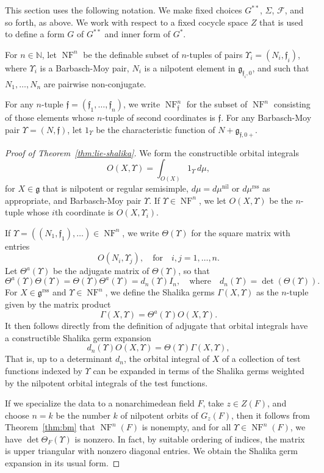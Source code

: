 \documentclass[12pt]{amsart}
\newcommand{\op}[1]{\operatorname{#1}}
\newcommand{\ring}[1]{{\mathbb #1}}
\def\NF{\op{NF}}
\def\Y{\Upsilon}
\def\s{{\mathfrak{f}}}
\newcommand{\cF}{\mathcal{F}}
\newcommand{\fg}{\mathfrak{g}}
\newcommand{\reg}{\mathrm{rss}}
\theoremstyle{plain}
\theoremstyle{definition}
\begin{document}
This section uses the following notation.  We make fixed choices
$G^{**}$, $\Sigma$, $\cF$, and so forth, as above.
We work with respect to a fixed cocycle space $Z$ that is used to
define a form $G$ of $G^{**}$ and inner form of $G^*$.

For $n\in \ring{N}$, let $\NF^n$ be the definable subset of $n$-tuples
of pairs $\Y_i=(N_i,\s_i)$, where $\Y_i$ is a Barbasch-Moy pair, $N_i$
is a nilpotent element in $\fg_{\s_i,0}$, and such that
$N_1,\ldots,N_n$ are pairwise non-conjugate.  


For any $n$-tuple $\s=(\s_1,\ldots,\s_n)$, we write $\NF^n_\s$ for the
subset of $\NF^n$ consisting of those elements whose $n$-tuple of
second coordinates is $\s$.  For any Barbasch-Moy pair $\Y=(N,\s)$,
let $1_\Y$ be the characteristic function of $N+\fg_{\s,0+}$.

\begin{proof}[Proof of Theorem~\ref{thm:lie-shalika}]


We form the constructible orbital integrals
\[
O(X,\Y) = \int_{O(X)} 1_{\Y} \,d\mu,
\]
for $X\in\fg$ that is nilpotent or regular semisimple,
$d\mu=d\mu^{\op{nil}}$ or $d\mu^\reg$ as appropriate, and Barbasch-Moy
pair $\Y$.  If $\Y\in \NF^n$, we let $O(X,\Y)$ be the $n$-tuple whose
$i$th coordinate is $O(X,\Y_i)$.

If $\Y=((N_1,\s_1),\ldots)\in \NF^n$, we write $\Theta(\Y)$ for the
square matrix with entries
\[
O(N_i,\Y_j),\quad\text{for}\quad i,j=1,\ldots,n.
\]
Let $\Theta^a(\Y)$ be the adjugate matrix of $\Theta(\Y)$, so that
\[
\Theta^a(\Y) \Theta(\Y) = \Theta(\Y) \Theta^a(\Y) = d_n(\Y)I_n,\quad 
\text{where}\quad d_n(\Y)=\det (\Theta(\Y)). 
\]
For $X\in \fg^\reg$ and $\Y\in \NF^n$, we define the Shalika germs
$\Gamma(X,\Y)$ as the $n$-tuple given by the matrix product
\[
\Gamma (X,\Y) = \Theta^a (\Y) O(X,\Y).
\]
It then follows directly from the definition of adjugate that orbital
integrals have a constructible Shalika germ expansion
\[
d_n(\Y) O(X,\Y) = \Theta(\Y)\Gamma(X,\Y),
\]
That is, up to a determinant $d_n$, the orbital
integral of $X$ of a collection of test functions indexed by $\Y$ can
be expanded in terms of the Shalika germs weighted by the nilpotent
orbital integrals of the test functions.

If we specialize the data to a nonarchimedean field $F$, take $z\in
Z(F)$, and choose $n=k$ be the number $k$ of nilpotent orbits of $G_z(F)$,
then it follows from Theorem~\ref{thm:bm} that $\NF^n(F)$ is nonempty,
and for all $\Y\in \NF^n(F)$, we have $\det\Theta_F(\Y)$ is
nonzero. In fact, by suitable ordering of indices, the matrix is upper
triangular with nonzero diagonal entries.  We obtain the Shalika germ
expansion in its usual form.
\end{proof}
\end{document}
